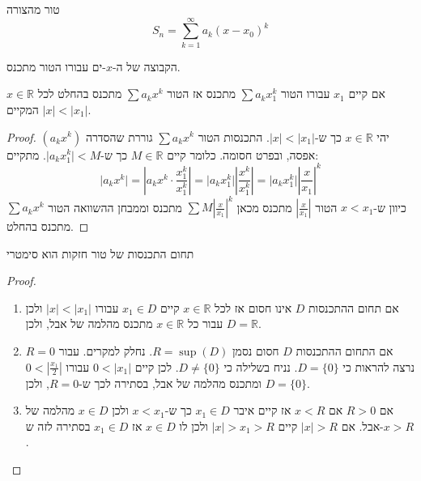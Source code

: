 \documentclass{tstextbook}
\begin{document}
\begin{definition}
טור מהצורה
$$S_{n}=\sum_{k=1}^{\infty}a_{k}(x-x_{0})^{k}$$

\end{definition}
\begin{definition}
הקבוצה של ה-\(x\)-ים עבורו הטור מתכנס.

\end{definition}
\begin{proposition}
אם קיים \(x_{1}\) עבורו הטור \(\sum a_{k}x_{1}^{k}\) מתכנס אז הטור \(\sum a_{k}x^{k}\) מתכנס בהחלט לכל \(x \in \mathbb{R}\) המקיים \(\lvert x \rvert<\lvert x_{1} \rvert\).

\end{proposition}
\begin{proof}
יהי \(x \in \mathbb{R}\) כך ש-\(\lvert x \rvert<\lvert x_{1} \rvert\). התכנסות הטור \(\sum a_{k}x^{k}\) גוררת שהסדרה \((a_{k}x^{k})\) אפסה, ובפרט חסומה. כלומר קיים \(M \in \mathbb{R}\) כך ש-\(\lvert a_{k}x_{1}^{k} \rvert<M\). מתקיים:
$$\lvert a_{k}x^{k} \rvert =\left\lvert  a_{k}x^{k}\cdot \frac{x_{1}^{k}}{x_{1}^{k}}  \right\rvert =\lvert a_{k}x_{1}^{k} \rvert \left\lvert  \frac{x^{k}}{x_{1}^{k}}  \right\rvert =\lvert a_{k}x_{1}^{k} \rvert \left\lvert  \frac{x}{x_{1}} \right\rvert^{k} $$
כיוון ש-\(x<x_{1}\) הטור \(\left\lvert  \frac{x}{x_{1}}  \right\rvert\) מתכנס מכאן \(\sum M\left\lvert  \frac{x}{x_{1}}  \right\rvert^{k}\) מתכנס וממבחן ההשוואה הטור \(\sum a_{k}x^{k}\) מתכנס בהחלט.

\end{proof}
\begin{proposition}
תחום התכנסות של טור חזקות הוא סימטרי

\end{proposition}
\begin{proof}
  \begin{enumerate}
    \item אם תחום ההתכנסות \(D\) אינו חסום אז לכל \(x \in \mathbb{R}\) קיים \(x_{1} \in D\) עבורו \(\lvert x \rvert<\lvert x_{1} \rvert\) ולכן עבור כל \(x \in \mathbb{R}\) מתכנס מהלמה של אבל, ולכן \(D=\mathbb{R}\). 


    \item אם התחום ההתכנסות \(D\) חסום נסמן \(R=\sup(D)\). נחלק למקרים. עבור \(R=0\) נרצה להראות כי \(D=\{ 0 \}\). נניח בשלילה כי \(D\neq \{ 0 \}\). לכן קיים \(0<\lvert x_{1} \rvert\) עבורו \(0<\left\lvert  \frac{x_{1}}{2}  \right\rvert\) ומתכנס מהלמה של אבל, בסתירה לכך ש-\(R=0\), ולכן \(D=\{ 0 \}\). 


    \item אם \(R> 0\) אם \(x< R\) אז קיים איבר \(x_{1} \in D\) כך ש-\(x<x_{1}\) ולכן \(x \in D\) מהלמה של אבל. אם \(\lvert x \rvert> R\) קיים \(\lvert x \rvert>x_{1}>R\) ולכן לו \(x \in D\) אז \(x_{1} \in D\) בסתירה לזה ש-\(x > R\). 


  \end{enumerate}
\end{proof}
\end{document}
